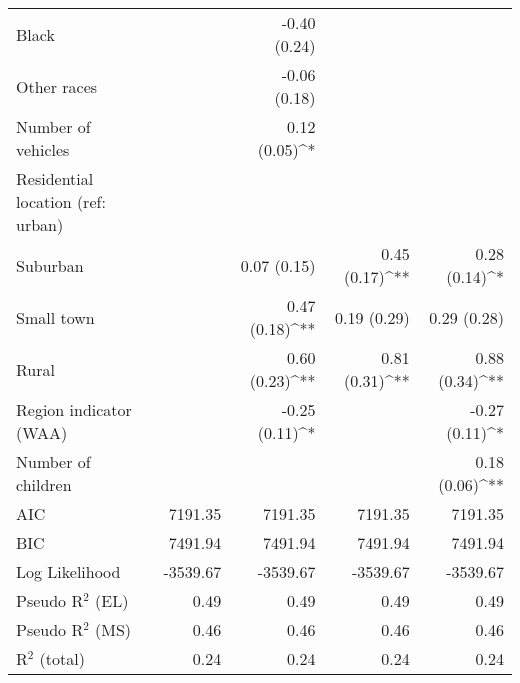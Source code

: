 \documentclass[%
    twoside, openright, titlepage, numbers=noenddot,%
    cleardoublepage=empty,%
    abstract=false,%
    BCOR=5.5mm, paper=a5, fontsize=10pt,%
]{scrreprt}
\begin{document}
\begin{Schunk}
\begin{table}[t!]
\begin{center}
{\begin{tabular}{l D{)}{)}{9)3} D{)}{)}{9)3} D{)}{)}{9)3} D{)}{)}{9)3}}
\quad Black                                &                      & -0.40 \; (0.24)      &                      &                       \\
\quad Other races                          &                      & -0.06 \; (0.18)      &                      &                       \\
Number of vehicles                         &                      & 0.12 \; (0.05)^{*}   &                      &                       \\
Residential location (ref: urban)          &                      &                      &                      &                       \\
\quad Suburban                             &                      & 0.07 \; (0.15)       & 0.45 \; (0.17)^{**}  & 0.28 \; (0.14)^{*}    \\
\quad Small town                           &                      & 0.47 \; (0.18)^{**}  & 0.19 \; (0.29)       & 0.29 \; (0.28)        \\
\quad Rural                                &                      & 0.60 \; (0.23)^{**}  & 0.81 \; (0.31)^{**}  & 0.88 \; (0.34)^{**}   \\
Region indicator (WAA)                     &                      & -0.25 \; (0.11)^{*}  &                      & -0.27 \; (0.11)^{*}   \\
Number of children                         &                      &                      &                      & 0.18 \; (0.06)^{**}   \\
\midrule
AIC                                        & 7191.35              & 7191.35              & 7191.35              & 7191.35               \\
BIC                                        & 7491.94              & 7491.94              & 7491.94              & 7491.94               \\
Log Likelihood                             & -3539.67             & -3539.67             & -3539.67             & -3539.67              \\
Pseudo R$^2$ (EL)                          & 0.49                 & 0.49                 & 0.49                 & 0.49                  \\
Pseudo R$^2$ (MS)                          & 0.46                 & 0.46                 & 0.46                 & 0.46                  \\
R$^2$ (total)                              & 0.24                 & 0.24                 & 0.24                 & 0.24                  \\

\end{tabular}}
\end{center}
\end{table}
\end{Schunk}
\end{document}
